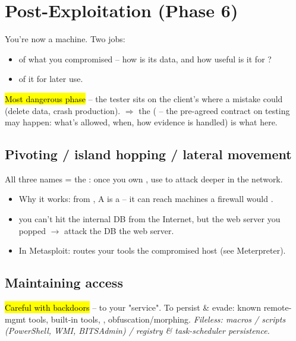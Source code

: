 \section{Post-Exploitation (Phase 6)}
You're now  a machine. Two jobs:
\begin{itemize}
\item {} of what you compromised -- how  is its data, and how useful is it for ?
\item {} of it for later use.
\end{itemize}

\hl{Most dangerous phase} -- the tester sits on the client's  where a mistake could  (delete data, crash production). $\Rightarrow$ the  ( -- the pre-agreed contract on  testing may happen: what's allowed, when, how evidence is handled) is what  here.

\subsection{Pivoting / island hopping / lateral movement}
All three names = the : once you own , use  to attack  deeper in the network.
\begin{itemize}
\item Why it works: from , A is a  -- it can reach machines a firewall would .
\item {} you can't hit the internal DB from the Internet, but the web server you popped  $\to$ attack the DB  the web server.
\item In Metasploit:  routes your tools  the compromised host (see Meterpreter).
\end{itemize}

\subsection{Maintaining access}
\hl{Careful with backdoors} --  to your "service". To persist \& evade: known remote-mgmt tools, built-in tools, , obfuscation/morphing. \textit{Fileless: macros / scripts (PowerShell, WMI, BITSAdmin) / registry \& task-scheduler persistence.}

